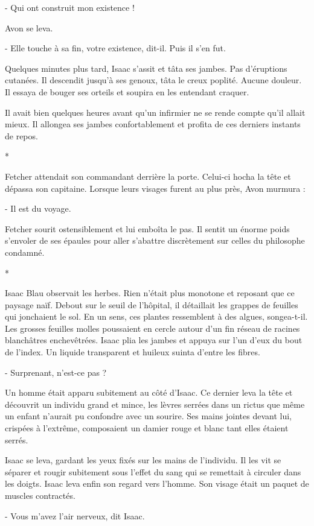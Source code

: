 \documentclass[12pt]{book}
\newcommand{\s}{\begin{center}
*
\end{center}
}
\begin{document}
- Qui ont construit mon existence !

Avon se leva.

- Elle touche à sa fin, votre existence, dit-il. Puis il s’en fut.


Quelques minutes plus tard, Isaac s’assit et tâta ses jambes. Pas d’éruptions cutanées. Il descendit jusqu’à ses genoux, tâta le creux poplité. Aucune douleur. Il essaya de bouger ses orteils et soupira en les entendant craquer.

Il avait bien quelques heures avant qu’un infirmier ne se rende compte qu’il allait mieux. Il allongea ses jambes confortablement et profita de ces derniers instants de repos.


\s


Fetcher attendait son commandant derrière la porte. Celui-ci hocha la tête et dépassa son capitaine. Lorsque leurs visages furent au plus près, Avon murmura :

- Il est du voyage.

Fetcher sourit ostensiblement et lui emboîta le pas. Il sentit un énorme poids s’envoler de ses épaules pour aller s’abattre discrètement sur celles du philosophe condamné.

\s

Isaac Blau observait les herbes. Rien n’était plus monotone et reposant que ce paysage naïf. Debout sur le seuil de l’hôpital, il détaillait les grappes de feuilles qui jonchaient le sol. En un sens, ces plantes ressemblent à des algues, songea-t-il. Les grosses feuilles molles poussaient en cercle autour d’un fin réseau de racines blanchâtres enchevêtrées. Isaac plia les jambes et appuya sur l’un d’eux du bout de l’index. Un liquide transparent et huileux suinta d’entre les fibres.


-  Surprenant, n’est-ce pas ?


Un homme était apparu subitement au côté d’Isaac. Ce dernier leva la tête et découvrit un individu grand et mince, les lèvres serrées dans un rictus que même un enfant n’aurait pu confondre avec un sourire. Ses mains jointes devant lui, crispées à l’extrême, composaient un damier rouge et blanc tant elles étaient serrés.


Isaac se leva, gardant les yeux fixés sur les mains de l’individu. Il les vit se séparer et rougir subitement sous l’effet du sang qui se remettait à circuler dans les doigts. Isaac leva enfin son regard vers l’homme. Son visage était un paquet de muscles contractés.


- Vous m’avez l’air nerveux, dit Isaac.
\end{document}
